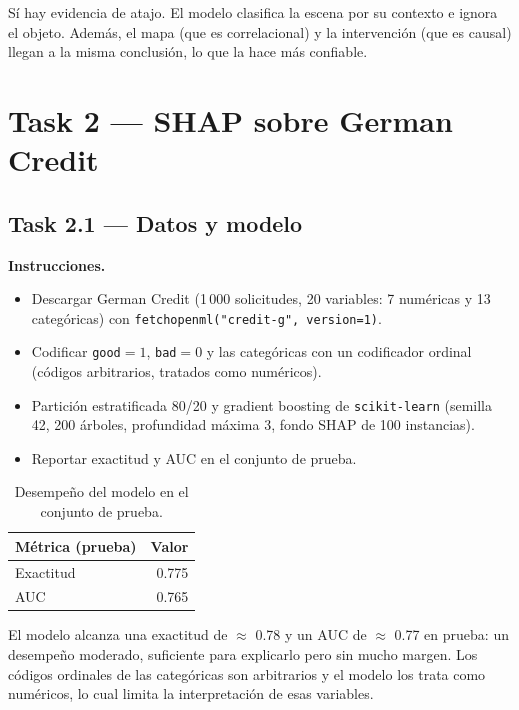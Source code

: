 \documentclass[11pt]{article}
\renewcommand{\_}{\textunderscore\allowbreak{}}
\begin{document}
Sí hay evidencia de atajo. El modelo clasifica la escena por su contexto e ignora el objeto. Además, el mapa (que es correlacional) y la intervención (que es causal) llegan a la misma conclusión, lo que la hace más confiable.

\newpage
\section*{Task 2 --- SHAP sobre German Credit}

\subsection*{Task 2.1 --- Datos y modelo}
\textbf{Instrucciones.}
\begin{itemize}
  \item Descargar German Credit (1\,000 solicitudes, 20 variables: 7 numéricas y 13 categóricas) con \texttt{fetch\_openml("credit-g", version=1)}.
  \item Codificar \texttt{good}$=1$, \texttt{bad}$=0$ y las categóricas con un codificador ordinal (códigos arbitrarios, tratados como numéricos).
  \item Partición estratificada 80/20 y gradient boosting de \texttt{scikit-learn} (semilla 42, 200 árboles, profundidad máxima 3, fondo SHAP de 100 instancias).
  \item Reportar exactitud y AUC en el conjunto de prueba.
\end{itemize}

\begin{table}[H]
\centering
\small
\begin{tabular}{lr}
\toprule
Métrica (prueba) & Valor \\
\midrule
Exactitud & 0.775 \\
AUC & 0.765 \\
\bottomrule
\end{tabular}
\caption{Desempeño del modelo en el conjunto de prueba.}
\end{table}

El modelo alcanza una exactitud de \(\approx\) 0.78 y un AUC de \(\approx\) 0.77 en prueba: un desempeño moderado, suficiente para explicarlo pero sin mucho margen. Los códigos ordinales de las categóricas son arbitrarios y el modelo los trata como numéricos, lo cual limita la interpretación de esas variables.
\end{document}
